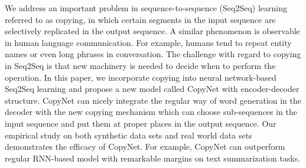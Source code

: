 We address an important problem in sequence-to-sequence (Seq2Seq) learning referred to as copying, in which certain segments in the input sequence are selectively replicated in the output sequence. A similar phenomenon is observable in human language communication. For example, humans tend to repeat entity names or even long phrases in conversation. The challenge with regard to copying in Seq2Seq is that new machinery is needed to decide when to perform the operation. In this paper, we incorporate copying into neural network-based Seq2Seq learning and propose a new model called CopyNet with encoder-decoder structure.  CopyNet can nicely integrate the regular way of word generation in the decoder with the new copying mechanism which can choose sub-sequences in the input sequence and put them at proper places in the output sequence. Our empirical study on both synthetic data sets and real world data sets demonstrates the efficacy of CopyNet. For example, CopyNet can outperform regular RNN-based model with remarkable margins on text summarization tasks.
